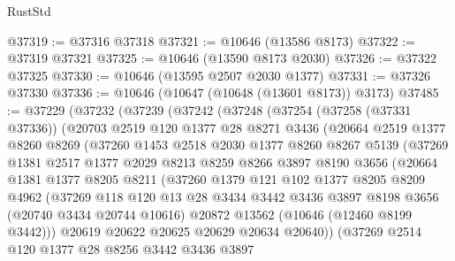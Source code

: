 \begin{lexlean}{RustStd}
\begin{coremodule}
@37319 := @37316 @37318
@37321 := @10646 (@13586 @8173)
@37322 := @37319 @37321
@37325 := @10646 (@13590 @8173 @2030)
@37326 := @37322 @37325
@37330 := @10646 (@13595 @2507 @2030 @1377)
@37331 := @37326 @37330
@37336 := @10646 (@10647 (@10648 (@13601 @8173)) @3173)
@37485 := @37229
    (@37232
      (@37239
        (@37242
          (@37248
            (@37254
              (@37258 (@37331 @37336))
              (@20703
                @2519
                @120
                @1377
                @28
                @8271
                @3436
                (@20664
                  @2519
                  @1377
                  @8260
                  @8269
                  (@37260
                    @1453
                    @2518
                    @2030
                    @1377
                    @8260
                    @8267
                    @5139
                    (@37269
                      @1381
                      @2517
                      @1377
                      @2029
                      @8213
                      @8259
                      @8266
                      @3897
                      @8190
                      @3656
                      (@20664
                        @1381
                        @1377
                        @8205
                        @8211
                        (@37260
                          @1379
                          @121
                          @102
                          @1377
                          @8205
                          @8209
                          @4962
                          (@37269
                            @118
                            @120
                            @13
                            @28
                            @3434
                            @3442
                            @3436
                            @3897
                            @8198
                            @3656
                            (@20740 @3434 @20744 @10616)
                            @20872
                            @13562
                            (@10646 (@12460 @8199 @3442)))
                          @20619
                          @20622
                          @20625
                          @20629
                          @20634
                          @20640))
                      (@37269
                        @2514
                        @120
                        @1377
                        @28
                        @8256
                        @3442
                        @3436
                        @3897

\end{coremodule}
\end{lexlean}
